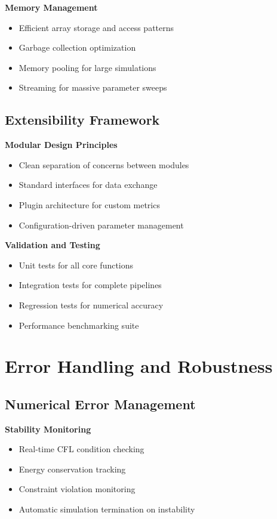 \documentclass[11pt]{article}
\begin{document}
\textbf{Memory Management}
\begin{itemize}
\item Efficient array storage and access patterns
\item Garbage collection optimization
\item Memory pooling for large simulations
\item Streaming for massive parameter sweeps
\end{itemize}

\subsection{Extensibility Framework}

\textbf{Modular Design Principles}
\begin{itemize}
\item Clean separation of concerns between modules
\item Standard interfaces for data exchange
\item Plugin architecture for custom metrics
\item Configuration-driven parameter management
\end{itemize}

\textbf{Validation and Testing}
\begin{itemize}
\item Unit tests for all core functions
\item Integration tests for complete pipelines
\item Regression tests for numerical accuracy
\item Performance benchmarking suite
\end{itemize}

\section{Error Handling and Robustness}

\subsection{Numerical Error Management}

\textbf{Stability Monitoring}
\begin{itemize}
\item Real-time CFL condition checking
\item Energy conservation tracking
\item Constraint violation monitoring
\item Automatic simulation termination on instability
\end{itemize}
\end{document}
